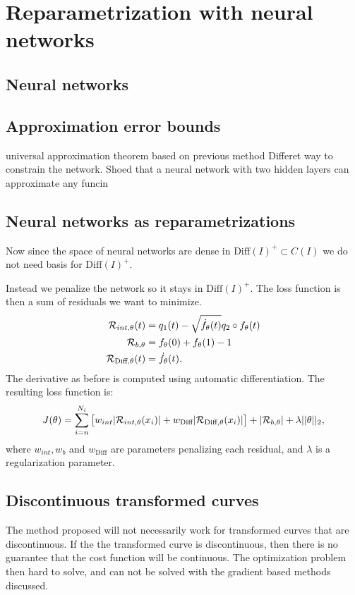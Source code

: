 
\section{Reparametrization with neural networks}
\subsection{Neural networks}


\subsection{Approximation error bounds}
universal approximation theorem
based on previous method
Differet way to constrain the network.
\cite[Theomrem 5.1]{ryck2021} Shoed that a neural network with two hidden layers can approximate any funcin 

\subsection{Neural networks as reparametrizations}
Now since the space of neural networks are dense in $\text{Diff}(I)^+ \subset C(I)$ we do not need basis for $\text{Diff}(I)^+$. 
  
Instead we penalize the network so it stays in $\text{Diff}(I)^+$. 
The loss function is then a sum of residuals we want to minimize.
\begin{align}
  {\cal R}_{int,\theta}(t)&= q_1(t) - \sqrt{\dot f_\theta(t)}q_2 \circ f_\theta(t) \\
  {\cal R}_{b,\theta}&= f_\theta(0) + f_\theta(1) - 1\\ 
  {\cal R}_{\text{Diff},\theta}(t)&= \dot f_{\theta}(t).
\end{align}
The derivative as before is computed using automatic differentiation. The resulting loss function is: 
\begin{equation}
  J(\theta) = \sum_{i=n}^{N_i}\big[w_{int}|{\cal R}_{int,\theta}(x_i)| +  w_{\text{Diff}}|{\cal R}_{\text{Diff}, \theta}(x_i)|\big]  +|{\cal R}_{b,\theta}|  + \lambda||\theta||_2,
\end{equation}
where $w_{int}, w_{b} $ and $w_{\text{Diff}}$ are parameters penalizing each residual, and  $\lambda$ is a regularization parameter. 
\subsection{Discontinuous transformed curves}
The method proposed will not necessarily work for transformed curves that are discontinuous. If the the transformed curve is discontinuous, then there is no guarantee that the cost function will be continuous. The optimization problem then hard to solve, and can not be solved with the gradient based methods discussed.

